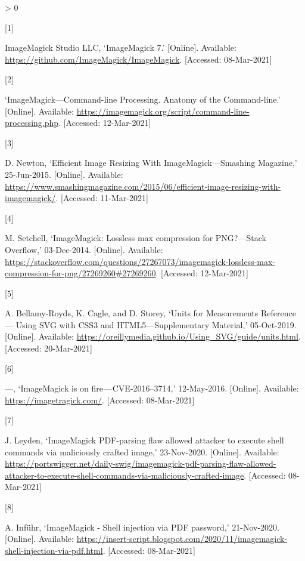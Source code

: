 \documentclass[
  11pt,
  british,
  a4paper,
]{article}
\newlength{\cslhangindent}
\newlength{\csllabelwidth}
\newenvironment{CSLReferences}[2] %
 {%
  \setlength{\parindent}{0pt}
  \ifodd #1 \everypar{\setlength{\hangindent}{\cslhangindent}}\ignorespaces\fi
  \ifnum #2 > 0
  \setlength{\parskip}{#2\baselineskip}
  \fi
 }%
 {}
\newcommand{\CSLLeftMargin}[1]{\parbox[t]{\csllabelwidth}{#1}}
\newcommand{\CSLRightInline}[1]{\parbox[t]{\linewidth - \csllabelwidth}{#1}\break}
\begin{document}
\hypertarget{refs}{}
\begin{CSLReferences}{0}{0}
\leavevmode\hypertarget{ref-imagemagicksource}{}%
\CSLLeftMargin{{[}1{]} }
\CSLRightInline{ImageMagick Studio LLC, {`ImageMagick 7.'} {[}Online{]}.
Available: \url{https://github.com/ImageMagick/ImageMagick}.
{[}Accessed: 08-Mar-2021{]}}

\leavevmode\hypertarget{ref-imcli}{}%
\CSLLeftMargin{{[}2{]} }
\CSLRightInline{{`{ImageMagick---Command-line Processing}. {Anatomy of
the Command-line}.'} {[}Online{]}. Available:
\url{https://imagemagick.org/script/command-line-processing.php}.
{[}Accessed: 12-Mar-2021{]}}

\leavevmode\hypertarget{ref-newton2015}{}%
\CSLLeftMargin{{[}3{]} }
\CSLRightInline{D. Newton, {`{Efficient Image Resizing With
ImageMagick---Smashing Magazine},'} 25-Jun-2015. {[}Online{]}.
Available:
\url{https://www.smashingmagazine.com/2015/06/efficient-image-resizing-with-imagemagick/}.
{[}Accessed: 11-Mar-2021{]}}

\leavevmode\hypertarget{ref-setchell2014}{}%
\CSLLeftMargin{{[}4{]} }
\CSLRightInline{M. Setchell, {`{ImageMagick: Lossless max compression
for PNG?---Stack Overflow},'} 03-Dec-2014. {[}Online{]}. Available:
\url{https://stackoverflow.com/questions/27267073/imagemagick-lossless-max-compression-for-png/27269260\#27269260}.
{[}Accessed: 12-Mar-2021{]}}

\leavevmode\hypertarget{ref-oreilly2019}{}%
\CSLLeftMargin{{[}5{]} }
\CSLRightInline{A. Bellamy-Royds, K. Cagle, and D. Storey, {`{Units for
Measurements Reference --- Using SVG with CSS3 and HTML5---Supplementary
Material},'} 05-Oct-2019. {[}Online{]}. Available:
\url{https://oreillymedia.github.io/Using_SVG/guide/units.html}.
{[}Accessed: 20-Mar-2021{]}}

\leavevmode\hypertarget{ref-imagetragick2016}{}%
\CSLLeftMargin{{[}6{]} }
\CSLRightInline{---, {`ImageMagick is on fire --- CVE-2016--3714,'}
12-May-2016. {[}Online{]}. Available: \url{https://imagetragick.com/}.
{[}Accessed: 08-Mar-2021{]}}

\leavevmode\hypertarget{ref-leyden2020}{}%
\CSLLeftMargin{{[}7{]} }
\CSLRightInline{J. Leyden, {`ImageMagick PDF-parsing flaw allowed
attacker to execute shell commands via maliciously crafted image,'}
23-Nov-2020. {[}Online{]}. Available:
\url{https://portswigger.net/daily-swig/imagemagick-pdf-parsing-flaw-allowed-attacker-to-execute-shell-commands-via-maliciously-crafted-image}.
{[}Accessed: 08-Mar-2021{]}}

\leavevmode\hypertarget{ref-infuhr2020}{}%
\CSLLeftMargin{{[}8{]} }
\CSLRightInline{A. Inführ, {`{ImageMagick - Shell injection via PDF
password},'} 21-Nov-2020. {[}Online{]}. Available:
\url{https://insert-script.blogspot.com/2020/11/imagemagick-shell-injection-via-pdf.html}.
{[}Accessed: 08-Mar-2021{]}}

\end{CSLReferences}
\end{document}
